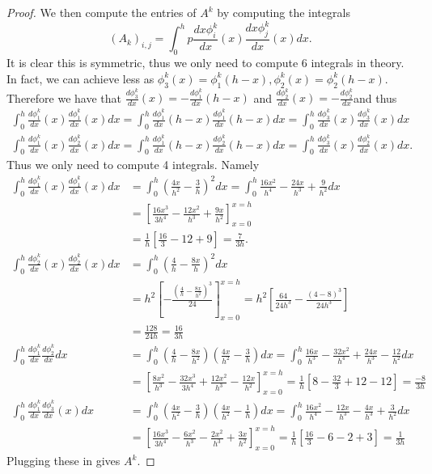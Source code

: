 \documentclass{amsart}
\theoremstyle{plain}
\theoremstyle{definition}
\begin{document}
\begin{proof}
    \par We then compute the entries of $A^k$ by computing the integrals
    $$\left(A_k\right)_{i,j} = \int_0^h p\frac{dx\phi_i^k}{dx}(x)\frac{dx\phi_j^k}{dx}(x) dx.$$
    It is clear this is symmetric, thus we only need to compute 6 integrals in theory. In fact, we can achieve less as $\phi_{3}^k(x) = \phi_{1}^{k}(h-x), \phi_2^k(x) = \phi_2^k(h-x)$. Therefore we have that 
    $\frac{d\phi_{3}^k}{dx}(x) = -\frac{d\phi_{1}^k}{dx}(h-x)$ and $\frac{d\phi_{2}^k}{dx}(x) = -\frac{d\phi_{2}^k}{dx} $and thus
    \begin{align*}
        \int_0^h \frac{d\phi_{1}^k}{dx}(x)\frac{d\phi_{1}^k}{dx}(x) dx = \int_0^h \frac{d\phi_{1}^k}{dx}(h-x)\frac{d\phi_{1}^k}{dx}(h-x) dx = \int_0^h \frac{d\phi_{3}^k}{dx}(x) \frac{d\phi_{3}^k}{dx}(x) dx\\
        \int_0^h \frac{d\phi_{1}^k}{dx}(x)\frac{d\phi_{2}^k}{dx}(x) dx = \int_0^h \frac{d\phi_{1}^k}{dx}(h-x)\frac{d\phi_{2}^k}{dx}(h-x) dx = \int_0^h \frac{d\phi_{3}^k}{dx}(x)\frac{d\phi_{2}^k}{dx}(x) dx. 
    \end{align*}
    Thus we only need to compute 4 integrals. Namely
    \begin{align*}
        \int_0^h \frac{d\phi_{1}^k}{dx}(x)\frac{d\phi_{1}^k}{dx}(x) dx &= \int_0^h \left(\frac{4x}{h^2}-\frac{3}{h}\right)^2 dx = \int_0^h \frac{16x^2}{h^4}-\frac{24x}{h^3}+\frac{9}{h^2} dx \\
        &= \left[\frac{16x^3}{3h^4}-\frac{12x^2}{h^3}+\frac{9x}{h^2} \right]_{x=0}^{x=h}\\
        &= \frac{1}{h}\left[\frac{16}{3}-12+9\right] =\frac{7}{3h}. \\
        \int_0^h \frac{d\phi_{2}^k}{dx}(x)\frac{d\phi_{2}^k}{dx}(x) dx &= \int_0^h \left(\frac{4}{h}-\frac{8x}{h}\right)^2 dx \\
        &= h^2\left[-\frac{\left(\frac{4}{h}-\frac{8x}{h^2}\right)^3}{24}\right]_{x=0}^{x=h}  = h^2 \left[\frac{64}{24h^3} - \frac{\left(4-8\right)^3}{24h^3}\right]\\
        &= \frac{128}{24h} = \frac{16}{3h}\\
        \int_0^h \frac{d\phi_{1}^k}{dx}\frac{d\phi_{2}^k}{dx} dx &= \int_0^h \left(\frac{4}{h}-\frac{8x}{h^2}\right)\left(\frac{4x}{h^2}-\frac{3}{h}\right) dx = \int_0^h \frac{16x}{h^3} - \frac{32x^2}{h^4} + \frac{24x}{h^3} - \frac{12}{h^2} dx \\
        &= \left[\frac{8x^2}{h^3} - \frac{32 x^3}{3h^4} + \frac{12 x^2}{h^3}-\frac{12x}{h^2}\right]_{x=0}^{x=h} = \frac{1}{h}\left[8-\frac{32}{3}+12-12\right] = \frac{-8}{3h}\\
        \int_0^h \frac{d\phi_{1}^k}{dx}\frac{d\phi_{3}^k}{dx}(x) dx &= \int_0^h \left(\frac{4x}{h^2}-\frac{3}{h}\right)\left(\frac{4x}{h^2} -\frac{1}{h}\right)dx = \int_0^h \frac{16x^2}{h^4}-\frac{12x}{h^3}-
        \frac{4x}{h^3} + \frac{3}{h^2}dx\\
        &= \left[\frac{16x^3}{3h^4}-\frac{6x^2}{h^3}-\frac{2x^2}{h^3} +\frac{3x}{h^2}\right]_{x=0}^{x=h} = \frac{1}{h}\left[\frac{16}{3}-6-2+3\right] = \frac{1}{3h}
    \end{align*}
    Plugging these in gives $A^k. $
\end{proof}
\end{document}
